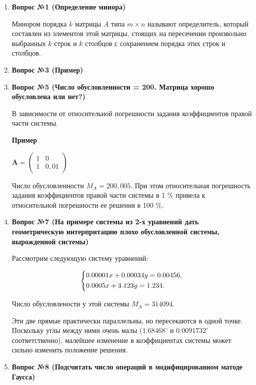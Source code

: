 \documentclass[12pt, a4paper]{article}
\begin{document}
	\begin{enumerate}
		\item \textbf{Вопрос №1 (Определение минора)}
		
		Минором порядка $k$ матрицы $A$ типа $m \times n$ называют определитель, который составлен из элементов этой матрицы, стоящих на пересечении произвольно выбранных $k$ строк и $k$ столбцов с сохранением порядка этих строк и столбцов.
		
		\item \textbf{Вопрос №3 (Пример)}
		
		\item \textbf{Вопрос №5 (Число обусловленности = 200. Матрица хорошо обусловлена или нет?)}
	
		В зависимости от относительной погрешности задания коэффициентов правой части системы.
		
		\textbf{Пример}
		
		$\mathbf{A}= \left(
		\begin{matrix}
			1 & 0 \\
			1 & 0,01
		\end{matrix}\right)$ 
		
		Число обусловленности $M_{A}=200,005$. При этом относительная погрешность задания коэффициентов правой части системы в 1 $\%$ привела к относительной погрешности ее решения в 100 $\%$.
		
		\item \textbf{Вопрос №7 (На примере системы из 2-х уравнений дать геометрическую интерпритацию плохо обусловленной системы, вырожденной системы)}
		
		Рассмотрим следующую систему уравнений:
	
		\begin{equation*}
			\begin{dcases}
				0.00001x + 0.00034y = 0.00456, \\
				0.0005x + 3.123y = 1.234. 
			\end{dcases}
		\end{equation*}
		
		Число обусловлености у этой системы $M_{A}= 314094$.
		
		Эти две прямые практически параллельны, но пересекаются в одной точке. Поскольку углы между ними очень малы ($1.68468^\circ$ и $0.0091732^\circ$ соответственно), малейшее изменение в коэффициентах системы может сильно изменить положение решения.
	
		\item \textbf{Вопрос №8 (Подсчитать число операций в модифицированном матоде Гаусса)}
		

\end{enumerate}
\end{document}
